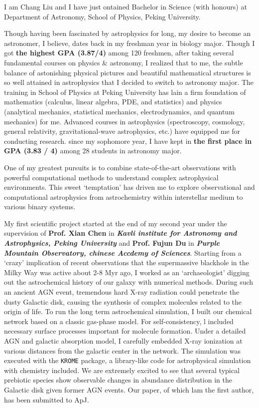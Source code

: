\documentclass[11pt, a4paper]{awesome-cv} %
\begin{document}
\makecvheader %
\newline\soptextstyle
	I am Chang Liu and I have just ontained Bachelor in Science (with honours) at Department of Astronomy, School of Physics, Peking University.

	Though having been fascinated by astrophysics for long, my desire to become an astronomer, I believe, dates back in my freshman year in biology major. Though I got \textbf{the highest GPA (3.87/4)} among 120 freshmen, after taking several fundamental courses on physics \& astronomy, I realized that to me, the subtle balance of astonishing physical pictures and beautiful mathematical structures is so well attained in astrophysics that I decided to switch to astronomy major. The training in School of Physics at Peking University has lain a firm foundation of mathematics (calculus, linear algebra, PDE, and statistics) and physics (analytical mechanics, statistical mechanics, electrodynamics, and quantum mechanics) for me. Advanced courses in astrophysics (spectroscopy, cosmology, general relativity, gravitational-wave astrophysics, etc.) have equipped me for conducting research. since my sophomore year, I have kept in \textbf{the first place in GPA (3.83 / 4)} among 28 students in astronomy major.
	
	One of my greatest pursuits is to combine state-of-the-art observations with powerful computational methods to understand complex astrophysical environments. This sweet `temptation' has driven me to explore observational and computational astrophysics from astrochemistry within interstellar medium to various binary systems.

\newline\soptextstyle

	My first scientific project started at the end of my second year under the supervision of \textbf{Prof. Xian Chen} in \textbf{\textit{Kavli institute for Astronomy and Astrophysics, Peking University}} and \textbf{Prof. Fujun Du} in \textbf{\textit{Purple Mountain Observatory, chinese Accdemy of Sciences}}. Starting from a `crazy' implication of recent observations that the supermassive blackhole in the Milky Way was active about 2-8 Myr ago, I worked as an `archaeologist' digging out the astrochemical history of our galaxy with numerical methods. During such an ancient AGN event, tremendous hard X-ray radiation could penetrate the dusty Galactic disk, causing the synthesis of complex molecules related to the origin of life. To run the long term astrochemical simulation, I built our chemical network based on a classic gas-phase model. For self-consistency, l included necessary surface processes important for molecule formation. Under a detailed AGN and galactic absorption model, I carefully embedded X-ray ionization at various distances from the galactic center in the network. The simulation was executed with the \texttt{KROME} package, a library-like code for astrophysical simulation with chemistry included. We are extremely excited to see that several typical prebiotic species show observable changes in abundance distribution in the Galactic disk given former AGN events. Our paper, of which lam the first author, has been submitted to ApJ.
	
\end{document}
